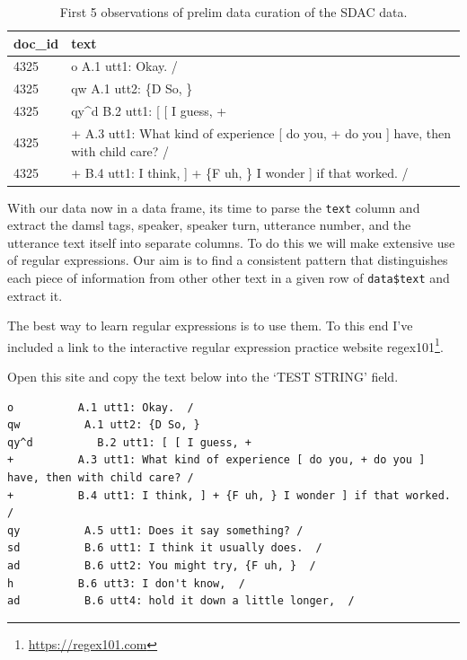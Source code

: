 \documentclass[
]{article}
\DeclareRobustCommand{\href}[2]{#2\footnote{\url{#1}}}
\begin{document}
\begin{table}

\caption{\label{tab:cd-semi-sdac-text-8}First 5 observations of prelim data curation of the SDAC data.}
\centering
\begin{tabular}[t]{ll}
\toprule
doc\_id & text\\
\midrule
4325 & o          A.1 utt1: Okay.  /\\
4325 & qw          A.1 utt2: \{D So, \}\\
4325 & qy\textasciicircum{}d          B.2 utt1: [ [ I guess, +\\
4325 & +          A.3 utt1: What kind of experience [ do you, + do you ] have, then with child care? /\\
4325 & +          B.4 utt1: I think, ] + \{F uh, \} I wonder ] if that worked. /\\
\bottomrule
\end{tabular}
\end{table}

With our data now in a data frame, its time to parse the \texttt{text} column and extract the damsl tags, speaker, speaker turn, utterance number, and the utterance text itself into separate columns. To do this we will make extensive use of regular expressions. Our aim is to find a consistent pattern that distinguishes each piece of information from other other text in a given row of \texttt{data\$text} and extract it.

The best way to learn regular expressions is to use them. To this end I've included a link to the interactive regular expression practice website \href{https://regex101.com}{regex101}.

Open this site and copy the text below into the `TEST STRING' field.

\begin{verbatim}
o          A.1 utt1: Okay.  /
qw          A.1 utt2: {D So, }
qy^d          B.2 utt1: [ [ I guess, +
+          A.3 utt1: What kind of experience [ do you, + do you ] have, then with child care? /
+          B.4 utt1: I think, ] + {F uh, } I wonder ] if that worked. /
qy          A.5 utt1: Does it say something? /
sd          B.6 utt1: I think it usually does.  /
ad          B.6 utt2: You might try, {F uh, }  /
h          B.6 utt3: I don't know,  /
ad          B.6 utt4: hold it down a little longer,  /
\end{verbatim}
\end{document}
